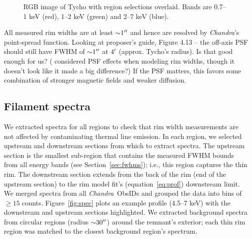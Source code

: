 \documentclass[iop, apj, numberedappendix, twocolappendix]{emulateapj}
\newcommand*{\abt}{\mathord{\sim}} %
\newcommand*{\Chandra}{\textit{Chandra}\ }
\begin{document}
\begin{figure}
    \centering
    \caption{RGB image of Tycho with region selections overlaid.  Bands are
    0.7--1 keV (red), 1--2 keV (green) and 2--7 keV (blue).
    }
    \label{fig:snr}
\end{figure}

All measured rim widths are at least $\abt 1\arcsec$ and hence are resolved by
\textit{Chandra}'s point-spread function.
Looking at proposer's guide, Figure 4.13 -- the off-axis PSF should
still have FWHM of $\abt 1\arcsec$ at $4\mbox{$^\prime$}$ (approx. Tycho's radius).
Is that good enough for us?
(\citet{cassam-chenai2007} considered PSF effects when modeling rim widths,
though it doesn't look like it made a big difference?) If the PSF matters, this
favors some combination of stronger magnetic fields and weaker diffusion.

\subsection{Filament spectra}
\label{sec:spec}

We extracted spectra for all regions to check that rim width measurements are
not affected by contaminating thermal line emission.  In each region, we
selected upstream and downstream sections from which to extract spectra.  The
upstream section is the smallest sub-region that contains the measured FWHM
bounds from all energy bands (see Section~\ref{sec:fwhms}); i.e., this region
captures the thin rim.  The downstream section extends from the back of the rim
(end of the upstream section) to the rim model fit's (equation~\eqref{eq:prof})
downstream limit.  We merged spectra from all \Chandra ObsIDs and grouped the
data into bins of $\geq 15$ counts.  Figure~\ref{fig:spec} plots an example
profile (4.5--7 keV) with the downstream and upstream sections highlighted.
We extracted background spectra from circular regions (radius $\abt 30\arcsec$)
around the remnant's exterior; each thin rim region was matched to the closest
background region's spectrum.
\end{document}
